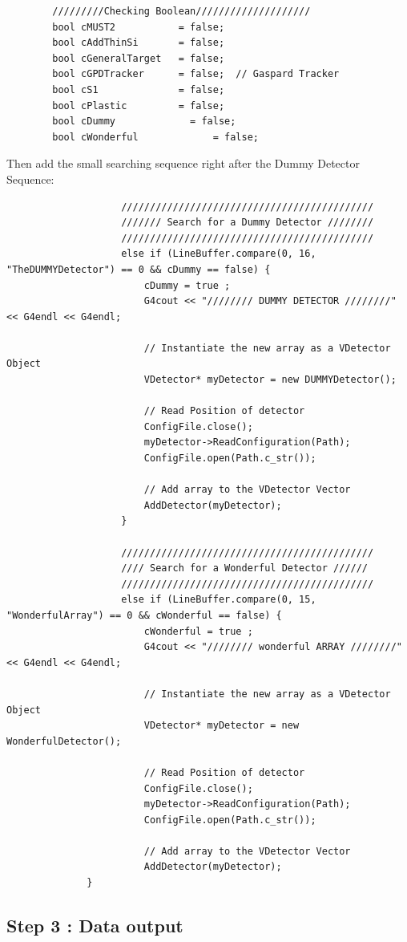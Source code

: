 \documentclass{book}
\begin{document}
	\begin{verbatim}
		/////////Checking Boolean////////////////////
		bool cMUST2           = false;
		bool cAddThinSi       = false;
		bool cGeneralTarget   = false;
		bool cGPDTracker      = false;	// Gaspard Tracker
		bool cS1              = false;
		bool cPlastic         = false;
		bool cDummy         	= false;
		bool cWonderful				= false;
	\end{verbatim}


	Then add the small searching sequence right after the Dummy Detector Sequence:
			
	\begin{verbatim}
					////////////////////////////////////////////
					/////// Search for a Dummy Detector ////////
					////////////////////////////////////////////
					else if (LineBuffer.compare(0, 16, "TheDUMMYDetector") == 0 && cDummy == false) {
						cDummy = true ;
						G4cout << "//////// DUMMY DETECTOR ////////" << G4endl << G4endl;

						// Instantiate the new array as a VDetector Object
						VDetector* myDetector = new DUMMYDetector();

						// Read Position of detector
						ConfigFile.close();
						myDetector->ReadConfiguration(Path);
						ConfigFile.open(Path.c_str());

						// Add array to the VDetector Vector
						AddDetector(myDetector);
					}

					////////////////////////////////////////////
					//// Search for a Wonderful Detector //////
					////////////////////////////////////////////
					else if (LineBuffer.compare(0, 15, "WonderfulArray") == 0 && cWonderful == false) {
						cWonderful = true ;
						G4cout << "//////// wonderful ARRAY ////////" << G4endl << G4endl;

						// Instantiate the new array as a VDetector Object
						VDetector* myDetector = new WonderfulDetector();

						// Read Position of detector
						ConfigFile.close();
						myDetector->ReadConfiguration(Path);
						ConfigFile.open(Path.c_str());

						// Add array to the VDetector Vector
						AddDetector(myDetector);
		      }
	\end{verbatim}

	\subsection{Step 3 : Data output}
\end{document}
